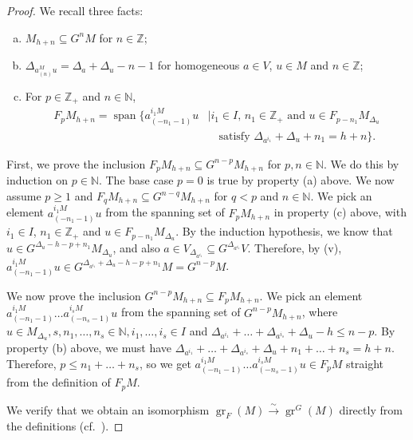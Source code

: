 \documentclass[a4paper, 12pt, reqno]{amsart}
\theoremstyle{remark}
\DeclareMathOperator{\gr}{gr}
\DeclareMathOperator{\vspan}{span}
\begin{document}
\begin{proof}
  We recall three facts:
  \begin{enumerate}[(a)]
  \item $M_{h + n} \subseteq G^nM$ for $n \in \mathbb{Z}$;
  \item $\Delta_{a^M_{(n)}u} = \Delta_a + \Delta_u - n - 1$ for homogeneous $a \in V$, $u \in M$ and $n \in \mathbb{Z}$;
  \item For $p \in \mathbb{Z}_+$ and $n \in \mathbb{N}$,
    \begin{equation*}
      \begin{split}
        F_pM_{h + n} = \vspan\{a^{i_1M}_{(-n_1 - 1)}u &\mid \text{$i_1 \in I$, $n_1 \in \mathbb{Z}_+$ and $u \in F_{p - n_1}M_{\Delta_u}$} \\
                                                      &\quad \text{satisfy $\Delta_{a^{i_1}} + \Delta_u + n_1 = h + n$}\}.
      \end{split}
    \end{equation*}
  \end{enumerate}

  First, we prove the inclusion $F_pM_{h + n} \subseteq G^{n - p}M_{h + n}$ for $p, n \in \mathbb{N}$.
  We do this by induction on $p \in \mathbb{N}$.
  The base case $p = 0$ is true by property (a) above.
  We now assume $p \ge 1$ and $F_qM_{h + n} \subseteq G^{n - q}M_{h + n}$ for $q < p$ and $n \in \mathbb{N}$.
  We pick an element $a^{i_1M}_{(-n_1 - 1)}u$ from the spanning set of $F_pM_{h + n}$ in property (c) above, with $i_1 \in I$, $n_1 \in \mathbb{Z}_+$ and $u \in F_{p - n_1}M_{\Delta_u}$.
  By the induction hypothesis, we know that $u \in G^{\Delta_u - h - p + n_1}M_{\Delta_u}$, and also $a \in V_{\Delta_{a^{i_1}}} \subseteq G^{\Delta_{a^{i_1}}}V$.
  Therefore, by (v), $a^{i_1M}_{(-n_1 - 1)}u \in G^{\Delta_{a^{i_1}} + \Delta_u - h - p + n_1}M = G^{n - p}M$.

  We now prove the inclusion $G^{n - p}M_{h + n} \subseteq F_pM_{h + n}$.
  We pick an element $a^{i_1M}_{(-n_1 - 1)}\dots a^{i_sM}_{(-n_s - 1)}u$ from the spanning set of $G^{n - p}M_{h + n}$, where $u \in M_{\Delta_u}, s, n_1, \dots, n_s \in \mathbb{N}, i_1, \dots, i_s \in I$ and $\Delta_{a^{i_1}} + \dots + \Delta_{a^{i_s}} + \Delta_u - h \le n - p$.
  By property (b) above, we must have $\Delta_{a^{i_1}} + \dots + \Delta_{a^{i_s}} + \Delta_u + n_1 + \dots + n_s = h + n$.
  Therefore, $p \le n_1 + \dots + n_s$, so we get $a^{i_1M}_{(-n_1 - 1)}\dots a^{i_sM}_{(-n_s - 1)}u \in F_pM$ straight from the definition of $F_pM$.

  We verify that we obtain an isomorphism $\gr_F(M) \xrightarrow{\sim} \gr^G(M)$ directly from the definitions (cf.\ ).
\end{proof}
\end{document}
